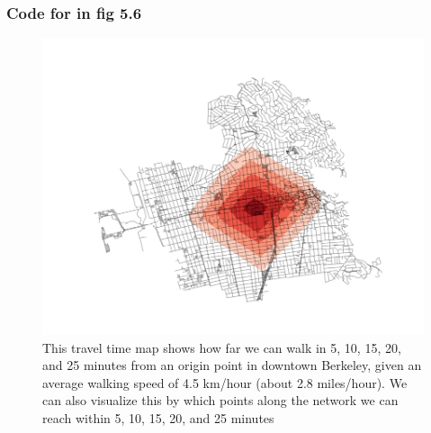 \subsubsection{Code for in fig 5.6}
\begin{figure}
	\centering
	\includegraphics[scale=0.5]{input/images/plot3.jpg}              
	\caption{This travel time map shows how far we can walk in 5, 10, 15, 20, and 25 minutes from an origin point in downtown Berkeley, given an average walking speed of 4.5 km/hour (about 2.8 miles/hour). We can also visualize this by which points along the network we can reach within 5, 10, 15, 20, and 25 minutes}
\end{figure}\\
